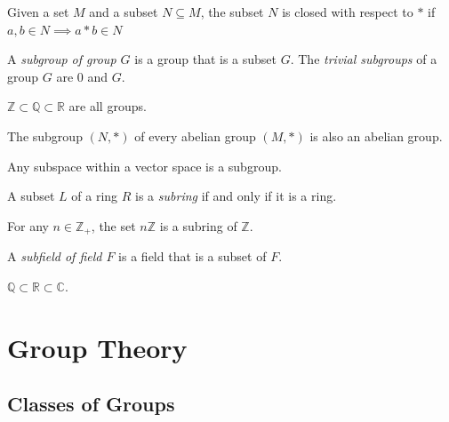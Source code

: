 \documentclass{article}
\begin{document}
\begin{definition}
  Given a set $M$ and a subset $N \subseteq M$, the subset $N$ is closed with respect to $*$ if $a, b \in N \implies a * b \in N$
\end{definition}

\begin{definition}
  A \textit{subgroup of group $G$} is a group that is a subset $G$. The \textit{trivial subgroups} of a group $G$ are $0$ and $G$. 
\end{definition}

\begin{example}
  $\mathbb{Z} \subset \mathbb{Q} \subset \mathbb{R}$ are all groups. 
\end{example}

\begin{theorem}
  The subgroup $(N, *)$ of every abelian group $(M, *)$ is also an abelian group. 
\end{theorem}

\begin{corollary}
  Any subspace within a vector space is a subgroup. 
\end{corollary}

\begin{definition}
  A subset $L$ of a ring $R$ is a \textit{subring} if and only if it is a ring. 
\end{definition}

\begin{example}
  For any $n \in \mathbb{Z}_{+}$, the set $n\mathbb{Z}$ is a subring of $\mathbb{Z}$. 
\end{example}

\begin{definition}
  A \textit{subfield of field $F$} is a field that is a subset of $F$.
\end{definition}

\begin{example}
  $\mathbb{Q} \subset \mathbb{R} \subset \mathbb{C}$. 
\end{example}

\section{Group Theory}

\subsection{Classes of Groups}
\end{document}
